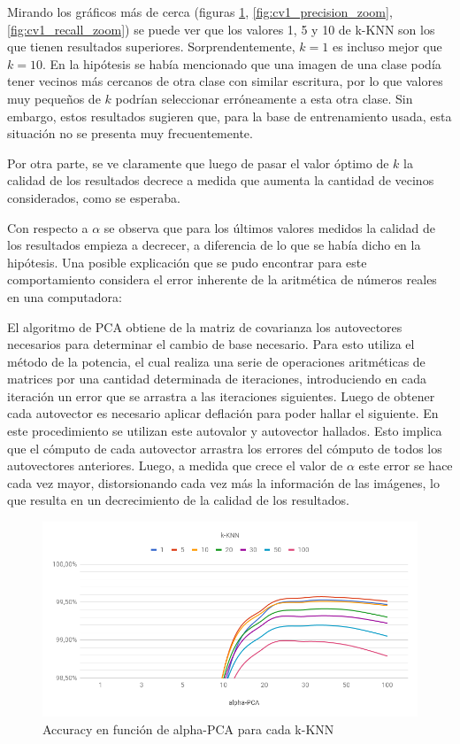 Mirando los gráficos más de cerca (figuras \ref{fig:cv1_accuracy_zoom}, \ref{fig:cv1_precision_zoom}, \ref{fig:cv1_recall_zoom}) se puede ver que los valores 1, 5 y 10 de k-KNN son los que tienen resultados superiores. Sorprendentemente, $k = 1$ es incluso mejor que $k = 10$. En la hipótesis se había mencionado que una imagen de una clase podía tener vecinos más cercanos de otra clase con similar escritura, por lo que valores muy pequeños de $k$ podrían seleccionar erróneamente a esta otra clase. Sin embargo, estos resultados sugieren que, para la base de entrenamiento usada, esta situación no se presenta muy frecuentemente.

Por otra parte, se ve claramente que luego de pasar el valor óptimo de $k$ la calidad de los resultados decrece a medida que aumenta la cantidad de vecinos considerados, como se esperaba.

Con respecto a $\alpha$ se observa que para los últimos valores medidos la calidad de los resultados empieza a decrecer, a diferencia de lo que se había dicho en la hipótesis. Una posible explicación que se pudo encontrar para este comportamiento considera el error inherente de la aritmética de números reales en una computadora:

El algoritmo de PCA obtiene de la matriz de covarianza los autovectores necesarios para determinar el cambio de base necesario. Para esto utiliza el método de la potencia, el cual realiza una serie de operaciones aritméticas de matrices por una cantidad determinada de iteraciones, introduciendo en cada iteración un error que se arrastra a las iteraciones siguientes. Luego de obtener cada autovector es necesario aplicar deflación para poder hallar el siguiente. En este procedimiento se utilizan este autovalor y autovector hallados. Esto implica que el cómputo de cada autovector arrastra los errores del cómputo de todos los autovectores anteriores. Luego, a medida que crece el valor de $\alpha$ este error se hace cada vez mayor, distorsionando cada vez más la información de las imágenes, lo que resulta en un decrecimiento de la calidad de los resultados.

\begin{figure}
    \centering
    \includegraphics[width=\textwidth]{graficos/cv1_accuracy_zoom.png}
    \caption{Accuracy en función de alpha-PCA para cada k-KNN}
    \label{fig:cv1_accuracy_zoom}
\end{figure}

